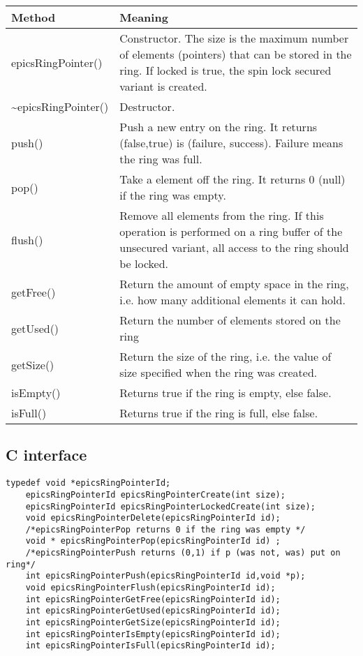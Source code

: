 \begin{center}
\begin{longtable}{p{1.27778in}p{5.0in}}
\textbf{Method} & \textbf{Meaning}\\
\hline
epicsRingPointer() & Constructor. The size is the maximum number of elements (pointers) that can be stored in the ring. If locked is true, the spin lock secured variant is created.\\
\~{}epicsRingPointer() & Destructor.\\
push() & Push a new entry on the ring. It returns (false,true) is (failure, success). Failure means the ring was full.\\
pop() & Take a element off the ring. It returns 0 (null) if the ring was empty.\\
flush() & Remove all elements from the ring. If this operation is performed on a ring buffer of the unsecured variant, all access to the ring should be locked.\\
getFree() & Return the amount of empty space in the ring, i.e. how many additional elements it can hold.\\
getUsed() & Return the number of elements stored on the ring\\
getSize() & Return the size of the ring, i.e. the value of size specified when the ring was created.\\
isEmpty() & Returns true if the ring is empty, else false.\\
isFull() & Returns true if the ring is full, else false.
\end{longtable}
\end{center}

\subsection{C interface}

\begin{verbatim}
typedef void *epicsRingPointerId;
    epicsRingPointerId epicsRingPointerCreate(int size);
    epicsRingPointerId epicsRingPointerLockedCreate(int size);
    void epicsRingPointerDelete(epicsRingPointerId id);
    /*epicsRingPointerPop returns 0 if the ring was empty */
    void * epicsRingPointerPop(epicsRingPointerId id) ;
    /*epicsRingPointerPush returns (0,1) if p (was not, was) put on ring*/
    int epicsRingPointerPush(epicsRingPointerId id,void *p);
    void epicsRingPointerFlush(epicsRingPointerId id);
    int epicsRingPointerGetFree(epicsRingPointerId id);
    int epicsRingPointerGetUsed(epicsRingPointerId id);
    int epicsRingPointerGetSize(epicsRingPointerId id);
    int epicsRingPointerIsEmpty(epicsRingPointerId id);
    int epicsRingPointerIsFull(epicsRingPointerId id);
\end{verbatim}

